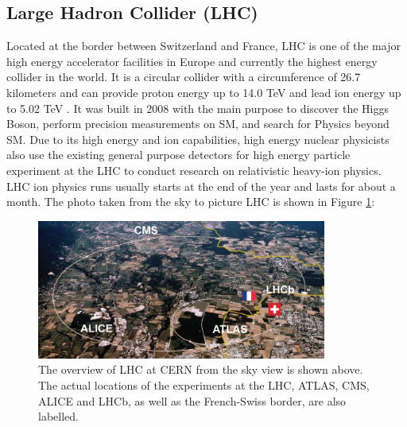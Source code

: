 \subsection{Large Hadron Collider (LHC)} 

Located at the border between Switzerland and France, LHC is one of the major high energy accelerator facilities in Europe and currently the highest energy collider in the world. It is a circular collider with a circumference of 26.7 kilometers and can provide proton energy up to 14.0 TeV and lead ion energy up to 5.02 TeV \cite{LHCReport}. It was built in 2008 with the main purpose to discover the Higgs Boson, perform precision measurements on SM, and search for Physics beyond SM. Due to its high energy and ion capabilities, high energy nuclear physicists also use the existing general purpose detectors for high energy particle experiment at the LHC to conduct research on relativistic heavy-ion physics. LHC ion physics runs usually starts at the end of the year and lasts for about a month. The photo taken from the sky to picture LHC is shown in Figure \ref{LHC}:

\begin{figure}[hbtp]
\begin{center}
\includegraphics[width=0.85\textwidth]{Figures/Chapter1/LHC.png}
\caption{The overview of LHC at CERN from the sky view is shown above. The actual locations of the experiments at the LHC, ATLAS, CMS, ALICE and LHCb, as well as the French-Swiss border, are also labelled.}
\label{LHC}
\end{center}
\end{figure} 

